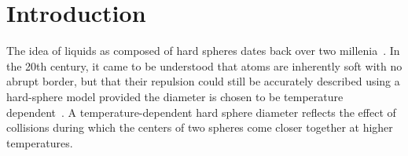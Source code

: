 \documentclass[letterpaper,twocolumn,amsmath,amssymb,prb]{revtex4-1}
\begin{document}


\section{Introduction}
The idea of liquids as composed of hard spheres dates back over two
millenia~\cite{lucretius}. In the 20th century, 
it came to be understood that atoms are
inherently soft with no abrupt border, but that their repulsion
could still be accurately described using a hard-sphere model provided the
diameter is chosen to be temperature dependent~\cite{rowlinson1964statistical,
barker1967perturbation, andersen1971relationship}. A temperature-dependent hard
sphere diameter reflects the effect of collisions during which the centers 
of two spheres
come closer together at higher temperatures. 
\end{document}
